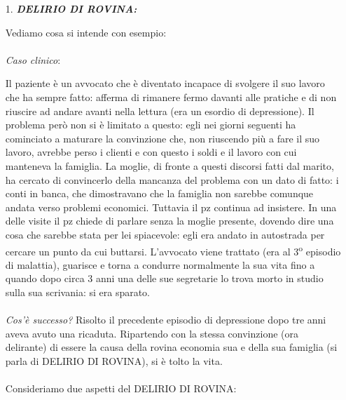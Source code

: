 \begin{itemize}
\item[1.]
  \textbf{\emph{DELIRIO DI ROVINA:}}

Vediamo cosa si intende con esempio:
\\\\
\emph{Caso clinico}:

Il paziente è un avvocato che è diventato incapace di svolgere il suo
lavoro che ha sempre fatto: afferma di rimanere fermo davanti alle
pratiche e di non riuscire ad andare avanti nella lettura (era un
esordio di depressione). Il problema però non si è limitato a questo:
egli nei giorni seguenti ha cominciato a maturare la convinzione che,
non riuscendo più a fare il suo lavoro, avrebbe perso i clienti e con
questo i soldi e il lavoro con cui manteneva la famiglia. La moglie, di
fronte a questi discorsi fatti dal marito, ha cercato di convincerlo
della mancanza del problema con un dato di fatto: i conti in banca, che
dimostravano che la famiglia non sarebbe comunque andata verso problemi
economici. Tuttavia il pz continua ad insistere. In una delle visite il
pz chiede di parlare senza la moglie presente, dovendo dire una cosa che
sarebbe stata per lei spiacevole: egli era andato in autostrada per
cercare un punto da cui buttarsi. L'avvocato viene trattato (era al 3\textsuperscript{o}
episodio di malattia), guarisce e torna a condurre normalmente la sua
vita fino a quando dopo circa 3 anni una delle sue segretarie lo trova
morto in studio sulla sua scrivania: si era sparato.
\\\\
\emph{Cos'è successo?} Risolto il precedente episodio di depressione
dopo tre anni aveva avuto una ricaduta. Ripartendo con la stessa
convinzione (ora delirante) di essere la causa della rovina economia sua
e della sua famiglia (si parla di DELIRIO DI ROVINA), si è tolto la
vita.
\\\\
Consideriamo due aspetti del DELIRIO DI ROVINA:


\end{itemize}
